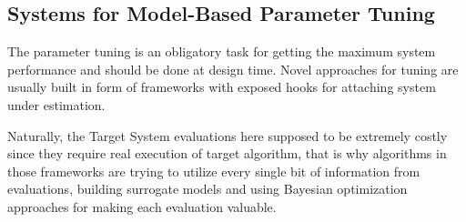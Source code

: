 \subsection{Systems for Model-Based Parameter Tuning}\label{bg: parameter tuning expamples}
The parameter tuning is an obligatory task for getting the maximum system performance and should be done at design time.
Novel approaches for tuning are usually built in form of frameworks with exposed hooks for attaching system under estimation.

Naturally, the Target System evaluations here supposed to be extremely costly since they require real execution of target algorithm, that is why algorithms in those frameworks are trying to utilize every single bit of information from evaluations, building surrogate models and using Bayesian optimization approaches for making each evaluation valuable.

